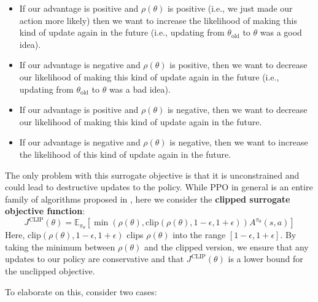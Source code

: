 \documentclass[journal, onecolumn, 12pt, draftclsnofoot]{IEEEtran}
\newcommand{\kword}[1]{\textbf{#1}}
\begin{document}
		\begin{itemize}
			\item If our advantage is positive and $\rho (\theta)$ is positive (i.e., we just made our action more likely) then we want to increase the likelihood of making this kind of update again in the future (i.e., updating from $\theta_\text{old}$ to $\theta$ was a good idea).
			\item If our advantage is negative and $\rho(\theta)$ is positive, then we want to decrease our likelihood of making this kind of update again in the future (i.e., updating from $\theta_\text{old}$ to $\theta$ was a bad idea).
			\item If our advantage is positive and $\rho(\theta)$ is negative, then we want to decrease our likelihood of making this kind of update again in the future.
			\item If our advantage is negative and $\rho(\theta)$ is negative, then we want to increase the likelihood of this kind of update again in the future.
		\end{itemize}
		\par The only problem with this surrogate objective is that it is unconstrained and could lead to destructive updates to the policy. While PPO in general is an entire family of algorithms proposed in \cite{ppo}, here we consider the \kword{clipped surrogate objective function}:
		\begin{equation}
			\label{eqn:clipped-objective-function}
			J^\text{CLIP}(\theta) = \mathbb{E}_{\pi_\theta} \left[ \min \left( \rho(\theta), \text{clip} (\rho(\theta), 1-\epsilon, 1+\epsilon) \right)  A^{\pi_\theta}(s,a) \right]
		\end{equation}
		Here, $\text{clip}(\rho(\theta), 1-\epsilon, 1+\epsilon)$ clips $\rho(\theta)$ into the range $[1-\epsilon, 1+\epsilon]$. By taking the minimum between $\rho(\theta)$ and the clipped version, we ensure that any updates to our policy are conservative and that $J^\text{CLIP}(\theta)$ is a lower bound for the unclipped objective.
		\par To elaborate on this, consider two cases:
\end{document}
